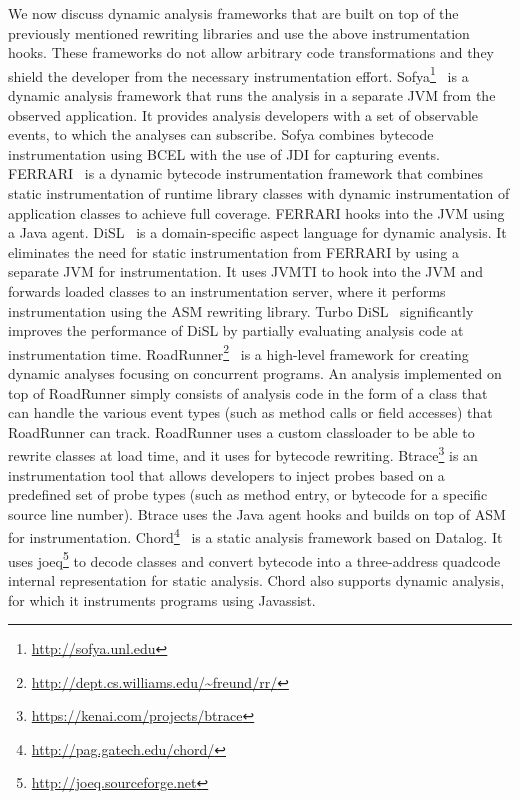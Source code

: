 We now discuss dynamic analysis frameworks that are built on top of the previously mentioned rewriting libraries
and use the above instrumentation hooks.
These frameworks do not allow arbitrary code transformations 
and they shield the developer from the necessary instrumentation effort.
Sofya\footnote{\url{http://sofya.unl.edu}}~\citep{kinneerSofyaSupportingRapid2007} 
is a dynamic analysis framework that runs the analysis in a separate JVM from the observed application.
It provides analysis developers with a set of observable events, to which the analyses can subscribe.
Sofya combines bytecode instrumentation using BCEL with the use of JDI for capturing events.
FERRARI~\citep{binderReengineeringStandardJava2007} is a dynamic bytecode instrumentation framework
that combines static instrumentation of runtime library classes with
dynamic instrumentation of application classes to achieve full coverage.
FERRARI hooks into the JVM using a Java agent.
DiSL~\citep{marekDiSLDomainspecificLanguage2012,marekDiSLExtensibleLanguage2012}
is a domain-specific aspect language for dynamic analysis.
It eliminates the need for static instrumentation from FERRARI
by using a separate JVM for instrumentation.
It uses JVMTI to hook into the JVM and 
forwards loaded classes to an instrumentation server,
where it performs instrumentation using the ASM rewriting library.
Turbo DiSL~\citep{zhengTurboDiSLPartial2012} significantly improves the performance of DiSL 
by partially evaluating analysis code at instrumentation time.
RoadRunner\footnote{\url{http://dept.cs.williams.edu/~freund/rr/}}~\citep{flanaganRoadRunnerDynamicAnalysis2010}
is a high-level framework for creating dynamic analyses focusing on concurrent programs.
An analysis implemented on top of RoadRunner simply consists of analysis code
in the form of a class that can handle the various event types 
(such as method calls or field accesses) that RoadRunner can track.
RoadRunner uses a custom classloader to be able to rewrite classes at load time,
and it uses \asm{} for bytecode rewriting.
Btrace\footnote{\url{https://kenai.com/projects/btrace}} is an instrumentation tool
that allows developers to inject probes based on a predefined set of probe types
(such as method entry, or bytecode for a specific source line number).
Btrace uses the Java agent hooks and builds on top of ASM for instrumentation.
Chord\footnote{\url{http://pag.gatech.edu/chord/}}~\citep{naik11} is a static analysis framework based on Datalog.
It uses joeq\footnote{\url{http://joeq.sourceforge.net}} to decode classes and 
convert bytecode into a three-address quadcode internal representation for static analysis.
Chord also supports dynamic analysis, 
for which it instruments programs using Javassist.

